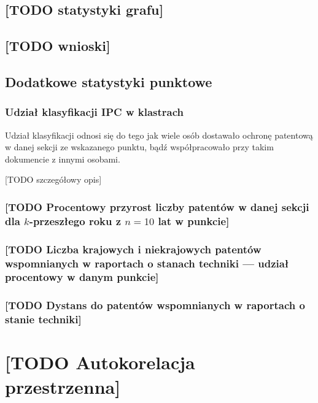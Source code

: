 \subsection{[TODO statystyki grafu]}

\subsection{[TODO wnioski]}




    \newpage\subsection
  {Dodatkowe statystyki punktowe}

  \subsubsection
{Udział klasyfikacji \ac{IPC} w klastrach}\label{udział-klasyfikacji}
Udział klasyfikacji odnosi się do tego jak wiele osób dostawało 
ochronę patentową w danej sekcji ze wskazanego punktu, 
bądź współpracowało przy takim dokumencie z innymi osobami.

[TODO szczegółowy opis]

  \subsubsection
{[TODO Procentowy przyrost liczby patentów w danej sekcji 
  dla $k$-przeszłego roku z $n=10$ lat w punkcie]}\label{przyrost-patentów}

  \subsubsection
{[TODO Liczba krajowych i niekrajowych patentów wspomnianych
  w raportach o stanach techniki --- udział procentowy w danym punkcie]}\label{rprt-krajowy}

  \subsubsection
{[TODO Dystans do patentów wspomnianych w raportach 
  o stanie techniki]}\label{rprt-krajowy-dystans}




    \newpage\section
  {[TODO Autokorelacja przestrzenna]}




